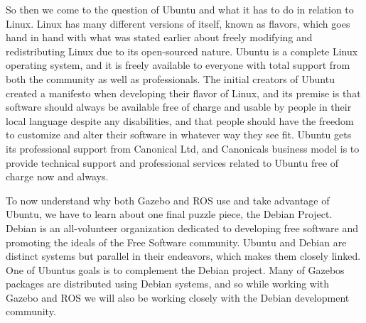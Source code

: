\documentclass[12pt]{article}
\begin{document}
So then we come to the question of Ubuntu and what it has to do in relation to Linux. Linux has many different versions of itself, known as flavors, which goes hand in hand with what was stated earlier about freely modifying and redistributing Linux due to its open-sourced nature. Ubuntu is a complete Linux operating system, and it is freely available to everyone with total support from both the community as well as professionals. The initial creators of Ubuntu created a manifesto when developing their flavor of Linux, and its premise is that software should always be available free of charge and usable by people in their local language despite any disabilities, and that people should have the freedom to customize and alter their software in whatever way they see fit.\cite{Ubuntu} Ubuntu gets its professional support from Canonical Ltd, and Canonicals business model is to provide technical support and professional services related to Ubuntu free of charge now and always.

To now understand why both Gazebo and ROS use and take advantage of Ubuntu, we have to learn about one final puzzle piece, the Debian Project. Debian is an all-volunteer organization dedicated to developing free software and promoting the ideals of the Free Software community. \cite{Debian} Ubuntu and Debian are distinct systems but parallel in their endeavors, which makes them closely linked. One of Ubuntus goals is to complement the Debian project. Many of Gazebos packages are distributed using Debian systems, and so while working with Gazebo and ROS we will also be working closely with the Debian development community.
\end{document}
